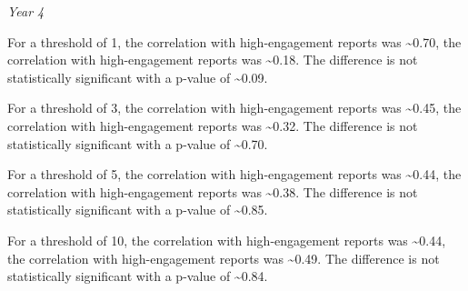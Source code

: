 \documentclass[
]{article}
\newenvironment{Shaded}{\begin{snugshade}}{\end{snugshade}}
\newcommand{\AttributeTok}[1]{\textcolor[rgb]{0.77,0.63,0.00}{#1}}
\newcommand{\FunctionTok}[1]{\textcolor[rgb]{0.00,0.00,0.00}{#1}}
\newcommand{\NormalTok}[1]{#1}
\newcommand{\OtherTok}[1]{\textcolor[rgb]{0.56,0.35,0.01}{#1}}
\newcommand{\SpecialCharTok}[1]{\textcolor[rgb]{0.00,0.00,0.00}{#1}}
\newcommand{\StringTok}[1]{\textcolor[rgb]{0.31,0.60,0.02}{#1}}
\begin{document}
\begin{Shaded}
\end{Shaded}

\emph{Year 4}

For a threshold of 1, the correlation with high-engagement reports was
\textasciitilde0.70, the correlation with high-engagement reports was
\textasciitilde0.18. The difference is not statistically significant
with a p-value of \textasciitilde0.09.

For a threshold of 3, the correlation with high-engagement reports was
\textasciitilde0.45, the correlation with high-engagement reports was
\textasciitilde0.32. The difference is not statistically significant
with a p-value of \textasciitilde0.70.

For a threshold of 5, the correlation with high-engagement reports was
\textasciitilde0.44, the correlation with high-engagement reports was
\textasciitilde0.38. The difference is not statistically significant
with a p-value of \textasciitilde0.85.

For a threshold of 10, the correlation with high-engagement reports was
\textasciitilde0.44, the correlation with high-engagement reports was
\textasciitilde0.49. The difference is not statistically significant
with a p-value of \textasciitilde0.84.
\end{document}

